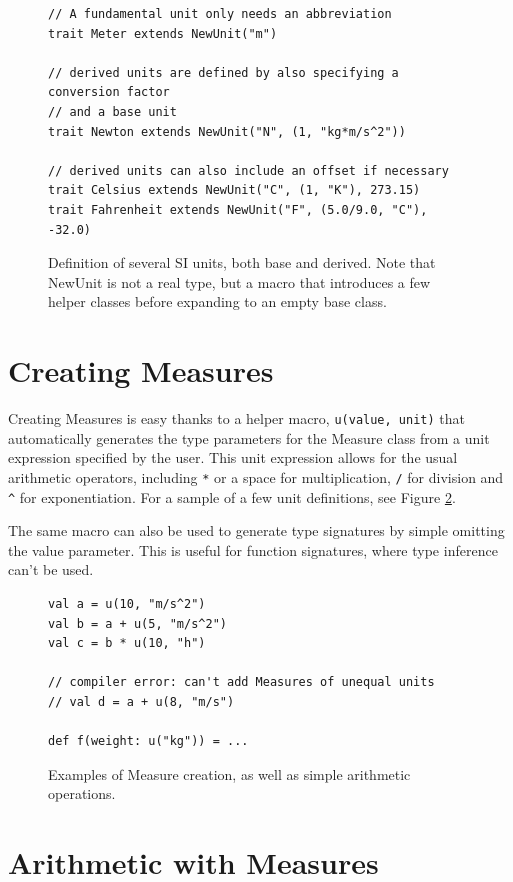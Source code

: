 \documentclass[12pt,oneside,a4paper]{scrbook}
\begin{document}
\begin{figure}
\begin{verbatim}
// A fundamental unit only needs an abbreviation
trait Meter extends NewUnit("m")

// derived units are defined by also specifying a conversion factor
// and a base unit
trait Newton extends NewUnit("N", (1, "kg*m/s^2"))

// derived units can also include an offset if necessary
trait Celsius extends NewUnit("C", (1, "K"), 273.15)
trait Fahrenheit extends NewUnit("F", (5.0/9.0, "C"), -32.0)
\end{verbatim}
\caption{Definition of several SI units, both base and derived. Note that NewUnit is not a real type, but a macro that introduces a few helper classes before expanding to an empty base class.}
\label{code:scala_define_units}
\end{figure}



\section{Creating Measures}
\label{sec:measure_creation}
Creating Measures is easy thanks to a helper macro, \verb|u(value, unit)| that automatically generates the type parameters for the Measure class from a unit expression specified by the user. This unit expression allows for the usual arithmetic operators, including \verb|*| or a space for multiplication, \verb|/| for division and \verb|^| for exponentiation. For a sample of a few unit definitions, see Figure \ref{code:scala_create_measure}.

The same macro can also be used to generate type signatures by simple omitting the value parameter. This is useful for function signatures, where type inference can't be used.

\begin{figure}
\begin{verbatim}
val a = u(10, "m/s^2")
val b = a + u(5, "m/s^2")
val c = b * u(10, "h")

// compiler error: can't add Measures of unequal units
// val d = a + u(8, "m/s")

def f(weight: u("kg")) = ...
\end{verbatim}
\caption{Examples of Measure creation, as well as simple arithmetic operations.}
\label{code:scala_create_measure}
\end{figure}

\section{Arithmetic with Measures}
\end{document}
